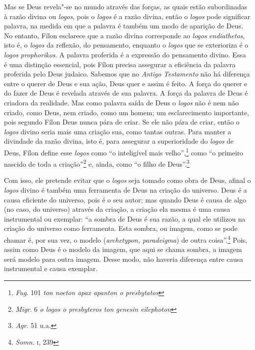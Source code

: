 Mas se Deus revela"-se no mundo através das forças, as quais estão
subordinadas à razão divina ou \emph{logos}, pois o
\emph{logos} é a razão divina, então o \emph{logos} pode
significar palavra, na medida em que a palavra é também um modo
de aparição de Deus. No entanto, Fílon esclarece que a razão
divina corresponde ao \emph{logos} \emph{endiathetos}, isto
é, o \emph{logos} da reflexão, do pensamento, enquanto o
\emph{logos} que se exterioriza é o \emph{logos}
\emph{prophorikos}. A palavra proferida é a expressão do
pensamento divino. Essa é uma distinção essencial, pois Fílon
precisa assegurar a eficiência da palavra proferida pelo Deus
judaico. Sabemos que no \emph{Antigo Testamento} não há
diferença entre o querer de Deus e sua ação, Deus quer e assim é
feito. A força do querer e do fazer de Deus é revelada através
de sua palavra. A força da palavra de Deus é criadora da
realidade. Mas como palavra saída de Deus o \emph{logos} não é
nem não criado, como Deus, nem criado, como um homem; um
esclarecimento importante, pois segundo Fílon Deus nunca pára de
criar. Se ele não pára de criar, então o \emph{logos} divino
seria mais uma criação sua, como tantas outras. Para manter a
divindade da razão divina, isto é, para assegurar a
superioridade do \emph{logos} de Deus, Fílon define esse
\emph{logos} como ``o inteligível mais velho'',\footnote{
\emph{Fug}. 101 \emph{ton noeton apax apanton o
presbytatos}} como ``o primeiro nascido de toda a
criação''\footnote{ \emph{Migr}. 6 \emph{o logos o
presbyteros ton genesin eilephoton}} e, ainda, como ``o filho de
Deus''.\footnote{ \emph{Agr}. 51 u.a.}

Com isso, ele pretende evitar que o \emph{logos} seja tomado
como obra de Deus, afinal o \emph{logos} divino é também uma
ferramenta de Deus na criação do universo. Deus é a causa
eficiente do universo, pois é o seu autor; mas quando Deus é
causa de algo (no caso, do universo) através da criação, a
criação ela mesma é uma causa instrumental ou exemplar: “a
sombra de Deus é sua razão, a qual ele utilizou na criação do
universo como ferramenta. Esta sombra, ou imagem, como se pode
chamar é, por sua vez, o modelo (\emph{archetypon,
paradeigma}) de outra coisa”.\footnote{
\emph{Somn.} \textsc{i}, 239} Pois, assim como Deus é o modelo da
imagem, que aqui se chama sombra, a imagem será modelo para
outra imagem. Desse modo, não haveria diferença entre causa
instrumental e causa exemplar.

